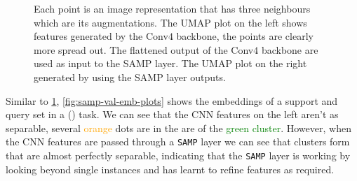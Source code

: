 \begin{figure}[h]
\begin{subfigure}[b]{0.4\textwidth}
     \end{subfigure}
     \caption{ Each point is an image representation that has three neighbours which are its augmentations. The UMAP plot on the left shows features generated by the Conv$4$ backbone, the points are clearly more spread out. The flattened output of the Conv$4$ backbone are used as input to the SAMP layer. The UMAP plot on the right generated by using the SAMP layer outputs.
     }
     \label{fig:samp-training-emb-plots}
\end{figure}

Similar to \cref{fig:samp-training-emb-plots}, \cref{fig:samp-val-emb-plots} shows the embeddings of a support and query set in a () task. We can see that the CNN features on the left aren't as separable, several \textcolor{orange}{orange} dots are in the are of the \textcolor{green}{green cluster}. However, when the CNN features are passed through a \texttt{SAMP} layer we can see that clusters form that are almost perfectly separable, indicating that the \texttt{SAMP} layer is working by looking beyond single instances and has learnt to refine features as required.

